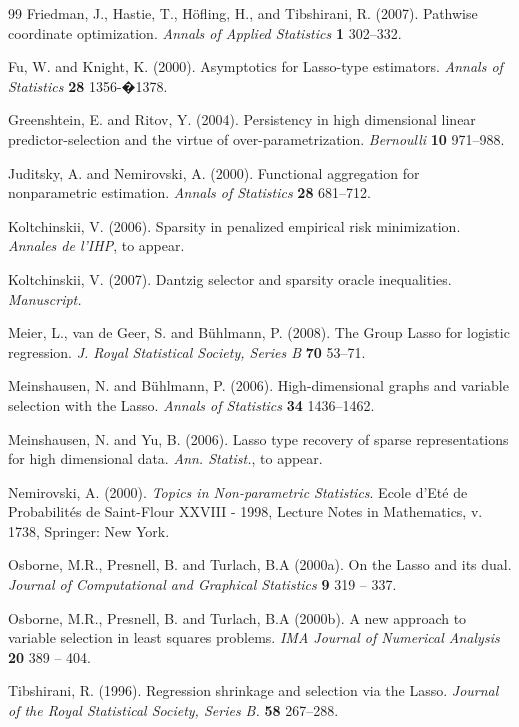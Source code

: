 \documentclass[dvips,aos]{imsart}
\numberwithin{equation}{section}
\theoremstyle{plain}
\begin{document}
\begin{thebibliography}{99}
 Friedman, J., Hastie, T., H\"ofling, H., and Tibshirani, R.
    (2007).
    Pathwise coordinate optimization.
    \emph{Annals of Applied Statistics} \textbf{1}
    302--332.

{\sc Fu, W.} and  {\sc Knight, K.} (2000). Asymptotics for
Lasso-type estimators. {\em Annals of Statistics}  \textbf{28}
1356-�1378.


{\sc Greenshtein, E.} and {\sc Ritov, Y.} (2004). Persistency in
high dimensional linear predictor-selection and the virtue of
over-parametrization. {\em Bernoulli} \textbf{10} 971--988.

{\sc Juditsky, A.} and {\sc Nemirovski, A.} (2000). Functional
aggregation for nonparametric estimation. {\em Annals of Statistics}
{\bf 28} 681--712.

{\sc Koltchinskii, V.} (2006). Sparsity in penalized empirical risk
minimization. {\em Annales de l'IHP}, to appear.

{\sc Koltchinskii, V.} (2007). Dantzig selector and sparsity oracle
inequalities. {\em Manuscript.}

{\sc Meier, L., van de Geer, S.} and {\sc B\"uhlmann, P.} (2008).
The Group Lasso for logistic regression. {\em J. Royal Statistical
Society, Series B} {\bf 70} 53--71.

{\sc Meinshausen, N.} and {\sc B\"uhlmann, P.} (2006).
High-dimensional graphs and variable selection with the Lasso. {\em
Annals of Statistics} {\bf 34} 1436--1462.

{\sc Meinshausen, N.} and {\sc Yu, B.} (2006). Lasso type recovery
of sparse representations for high dimensional data. \emph{Ann. Statist.}, to appear.


{\sc Nemirovski, A.} (2000). {\it Topics in Non-parametric
Statistics}. Ecole d'Et\'e de Probabilit\'es de Saint-Flour XXVIII -
1998, Lecture Notes in Mathematics, v. 1738, Springer: New York.

{\sc Osborne, M.R., Presnell, B.} and {\sc Turlach, B.A } (2000a).
On the Lasso and its dual. {\em Journal of Computational and
Graphical Statistics} \textbf{9} 319 -- 337.


{\sc Osborne, M.R., Presnell, B.} and {\sc Turlach, B.A } (2000b). A
new approach to variable selection in least squares problems. {\em
IMA Journal of Numerical Analysis} \textbf{20} 389 -- 404.


{\sc Tibshirani, R.} (1996). Regression shrinkage and selection via
the Lasso. {\em Journal of the Royal Statistical Society, Series B.}
{\bf 58} 267--288.


\end{thebibliography}
\end{document}
